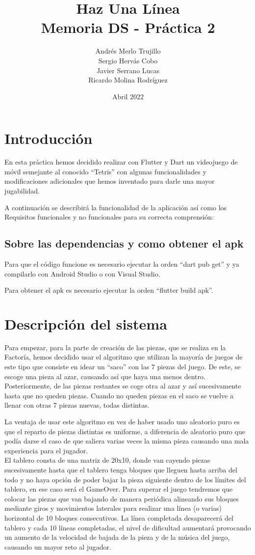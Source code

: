 \documentclass{article}
\title{Haz Una Línea\\
\large Memoria DS - Práctica 2}
\author{Andrés Merlo Trujillo\\ Sergio Hervás Cobo\\ Javier Serrano Lucas\\ Ricardo Molina Rodríguez}
\begin{document}
\date{Abril 2022}
\maketitle
\section{Introducción}
En esta práctica hemos decidido realizar con Flutter y Dart un videojuego de móvil
semejante al conocido ``Tetris'' con algunas funcionalidades y modificaciones adicionales
que hemos inventado para darle una mayor jugabilidad.

A continuación se describirá la funcionalidad de la aplicación así como los Requisitos
funcionales y no funcionales para su correcta comprensión:

\subsection{Sobre las dependencias y como obtener el apk}
Para que el código funcione es necesario ejecutar la orden ``dart pub get'' y ya
compilarlo con Android Studio o con Visual Studio.

Para obtener el apk es necesario ejecutar la orden ``flutter build apk''.


\section{Descripción del sistema}
Para empezar, para la parte de creación de las piezas, que se realiza en la Factoría, hemos
 decidido usar el algoritmo que utilizan la mayoría de juegos de este tipo que
 consiste en idear un ``saco'' con las 7 piezas del juego. De este, se escoge una pieza al azar,
 causando así que haya una menos dentro. Posteriormente, de las piezas restantes se coge otra al azar
  y así sucesivamente hasta que no queden piezas. Cuando no queden piezas en el saco se vuelve
  a llenar con otras 7 piezas nuevas, todas distintas.

La ventaja de usar este algoritmo en vez de haber usado uno aleatorio puro es
 que el reparto de piezas distintas es uniforme, a diferencia de aleatorio puro
 que podía darse el caso de que saliera varias veces la misma pieza causando una
 mala experiencia para el jugador.\\


El tablero consta de una matriz de 20x10, donde van cayendo piezas sucesivamente
hasta que el tablero tenga bloques que lleguen hasta arriba del todo y no haya
opción de poder bajar la pieza siguiente dentro de los límites del tablero, en
ese caso será el GameOver. Para superar el juego tendremos que colocar
las piezas que van bajando de manera periódica alineando sus bloques mediante
giros y movimientos laterales para realizar una línea (o varias) horizontal de
10 bloques consecutivos. La línea completada desaparecerá del tablero y cada 10 líneas
completadas, el nivel de dificultad aumentará provocando un aumento de la velocidad de
bajada de la pieza y de la música del juego, causando un mayor reto al jugador.\\
\end{document}
